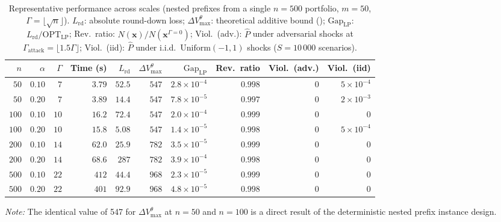\documentclass[11pt, a4paper]{article}
\theoremstyle{plain}
\theoremstyle{definition}
\theoremstyle{remark}
\begin{document}
\begin{table}[H]
\centering
\caption{Representative performance across scales (nested prefixes from a single $n=500$
portfolio, $m=50$, $\Gamma=\lfloor\sqrt{n}\rfloor$).
$L_{\mathrm{rd}}$: absolute round-down loss;
$\Delta V_{\max}^\theta$: theoretical additive bound
();
$\mathrm{Gap}_{\mathrm{LP}}$: $L_{\mathrm{rd}}/\mathrm{OPT}_{\mathrm{LP}}$;
Rev.\ ratio: $N(\bm x)/N(\bm x^{\Gamma=0})$;
Viol.\ (adv.): $\hat P$ under adversarial shocks at
$\Gamma_{\mathrm{attack}}=\lfloor1.5\Gamma\rfloor$;
Viol.\ (iid): $\hat P$ under i.i.d.\ $\mathrm{Uniform}(-1,1)$ shocks
($S=10\,000$ scenarios).}
\label{tab:numerics_summary}
\small
\begin{tabular}{r r r r r r r r r r}
\toprule
$n$ & $\alpha$ & $\Gamma$ &
Time (s) &
$L_{\mathrm{rd}}$ &
$\Delta V_{\max}^\theta$ &
$\mathrm{Gap}_{\mathrm{LP}}$ &
Rev.\ ratio &
Viol.\ (adv.) &
Viol.\ (iid) \\
\midrule
$50$ & $0.10$ & $7$
 & $3.79$ & $52.5$ & $547$ & $2.8\!\times\!10^{-4}$ & $0.998$ & $0$ & $5\!\times\!10^{-4}$ \\
$50$ & $0.20$ & $7$
 & $3.89$ & $14.4$ & $547$ & $7.8\!\times\!10^{-5}$ & $0.997$ & $0$ & $2\!\times\!10^{-3}$ \\
\midrule
$100$ & $0.10$ & $10$
 & $16.2$ & $72.4$ & $547$ & $2.0\!\times\!10^{-4}$ & $0.999$ & $0$ & $0$ \\
$100$ & $0.20$ & $10$
 & $15.8$ & $5.08$ & $547$ & $1.4\!\times\!10^{-5}$ & $0.998$ & $0$ & $5\!\times\!10^{-4}$ \\
\midrule
$200$ & $0.10$ & $14$
 & $62.0$ & $25.9$ & $782$ & $3.5\!\times\!10^{-5}$ & $0.999$ & $0$ & $0$ \\
$200$ & $0.20$ & $14$
 & $68.6$ & $287$ & $782$ & $3.9\!\times\!10^{-4}$ & $0.998$ & $0$ & $0$ \\
\midrule
$500$ & $0.10$ & $22$
 & $412$ & $44.4$ & $968$ & $2.3\!\times\!10^{-5}$ & $0.999$ & $0$ & $0$ \\
$500$ & $0.20$ & $22$
 & $401$ & $92.9$ & $968$ & $4.8\!\times\!10^{-5}$ & $0.998$ & $0$ & $0$ \\
\bottomrule
\end{tabular}
\par\vspace{2pt}
\footnotesize\emph{Note:} The identical value of 547 for $\Delta V_{\max}^\theta$ at $n=50$ and $n=100$ is a direct result of the deterministic nested prefix instance design.
\end{table}
\end{document}
